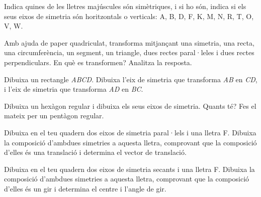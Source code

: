 \begin{mylist}
\exer \mental Indica quines de les lletres majúscules són simètriques, i si ho són, indica si els seus eixos de simetria són horitzontals o verticals: A, B, D, F, K, M, N, R, T, O, V, W.


\exer  Amb ajuda de paper quadriculat, transforma mitjançant una simetria, una recta, una circumferència, un segment, un triangle, dues rectes paral·leles i dues rectes perpendiculars. En què es transformen? Analitza la resposta.


\exer  Dibuixa un rectangle \textit{ABCD}. Dibuixa l'eix de simetria que transforma \textit{AB} en \textit{CD}, i l'eix de simetria que transforma \textit{AD} en \textit{BC}.


\exer  Dibuixa un hexàgon regular i dibuixa els seus eixos de simetria. Quants té? Fes el mateix per un pentàgon regular.


\exer  Dibuixa en el teu quadern dos eixos de simetria paral·lels i una lletra F. Dibuixa la composició d'ambdues simetries a aquesta lletra, comprovant que la composició d'elles és una translació i determina el vector de translació.


\exer  Dibuixa en el teu quadern dos eixos de simetria secants i una lletra F. Dibuixa la composició d'ambdues simetries a aquesta lletra, comprovant que la composició d'elles és un gir i determina el centre i l'angle de gir.



\end{mylist}
